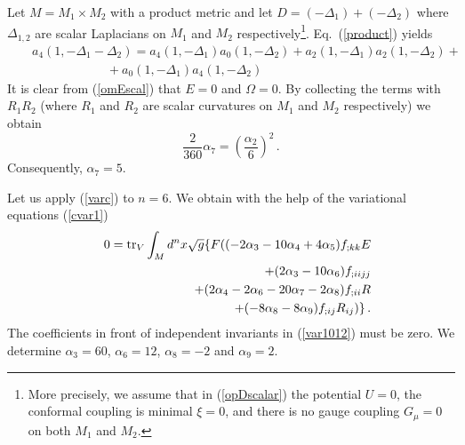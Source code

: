 Let $M=M_1\times M_2$ with a product metric and let $D=(-\Delta_1)+
(-\Delta_2)$ where $\Delta_{1,2}$ are scalar Laplacians on $M_1$ and
$M_2$ respectively\footnote{More precisely, we assume that in 
(\ref{opDscalar}) the potential $U=0$, the conformal coupling is minimal
$\xi=0$, and there is no gauge coupling $G_\mu=0$ on both $M_1$
and $M_2$.}.
Eq.\ (\ref{product}) yields
\begin{eqnarray}
&&a_4(1,-\Delta_1-\Delta_2)=
a_4(1,-\Delta_1)a_0(1,-\Delta_2)+
a_2(1,-\Delta_1)a_2(1,-\Delta_2)+ \nonumber \\
&&\qquad\qquad\qquad +a_0(1,-\Delta_1)a_4(1,-\Delta_2)
\label{prod4}
\end{eqnarray}
It is clear from (\ref{omEscal}) that $E=0$ and $\Omega =0$. 
By collecting the terms
with $R_1R_2$ (where $R_1$ and $R_2$ are scalar curvatures on
$M_1$ and $M_2$ respectively) we obtain
$$
\frac 2{360} \alpha_7 = \left( \frac{\alpha_2}6 \right)^2 \,.
$$
Consequently, $\alpha_7=5$. 

Let us apply (\ref{varc}) to $n=6$.
We obtain with the help of the variational equations (\ref{cvar1})
\begin{eqnarray}
&&0={\rm tr}_V \int_M d^nx\sqrt{g} \{ F( (-2\alpha_3-10\alpha_4+4\alpha_5)f_{;kk}E
\nonumber\\
&&\qquad +(2\alpha_3 -10\alpha_6)f_{;iijj}
\nonumber\\
&&\qquad +(2\alpha_4-2\alpha_6-20\alpha_7-2\alpha_8 )f_{;ii}R
\nonumber \\
&&\qquad +(-8\alpha_8-8\alpha_9 )f_{;ij}R_{ij} )\} \,.
\label{var1012}
\end{eqnarray}
The coefficients in front of independent invariants in (\ref{var1012})
must be zero. We determine $\alpha_3=60$, $\alpha_6=12$,
$\alpha_8=-2$ and $\alpha_9=2$.

